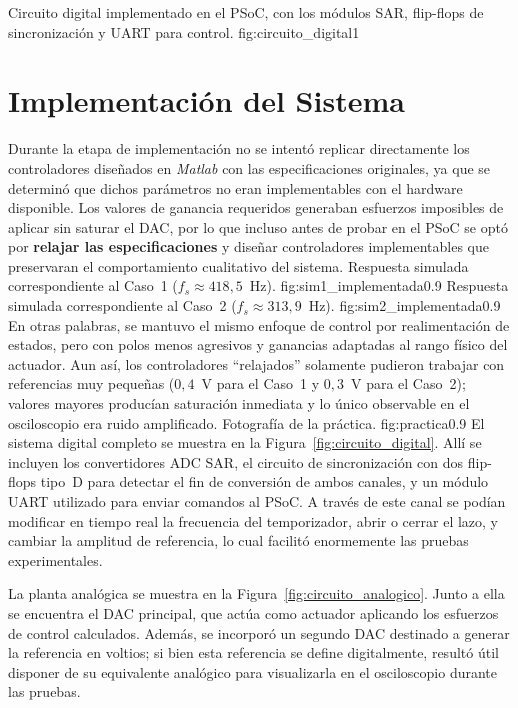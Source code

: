 
{Circuito digital implementado en el PSoC, con los módulos SAR, flip-flops de sincronización y UART para control.}
{fig:circuito_digital}{1}
\section{Implementación del Sistema}

Durante la etapa de implementación no se intentó replicar directamente los controladores diseñados en \textit{Matlab} con las especificaciones originales, 
ya que se determinó que dichos parámetros no eran implementables con el hardware disponible. 
Los valores de ganancia requeridos generaban esfuerzos imposibles de aplicar sin saturar el DAC, 
por lo que incluso antes de probar en el PSoC se optó por \textbf{relajar las especificaciones} 
y diseñar controladores implementables que preservaran el comportamiento cualitativo del sistema.
{Respuesta simulada correspondiente al Caso~1 ($f_s \approx 418{,}5$~Hz).}
{fig:sim1_implementada}{0.9}
{Respuesta simulada correspondiente al Caso~2 ($f_s \approx 313{,}9$~Hz).}
{fig:sim2_implementada}{0.9}
En otras palabras, se mantuvo el mismo enfoque de control por realimentación de estados, 
pero con polos menos agresivos y ganancias adaptadas al rango físico del actuador. 
Aun así, los controladores “relajados” solamente pudieron trabajar con referencias muy pequeñas 
($0{,}4$~V para el Caso~1 y $0{,}3$~V para el Caso~2); 
valores mayores producían saturación inmediata y lo único observable en el osciloscopio era ruido amplificado.
{Fotografía de la práctica.}
{fig:practica}{0.9}
El sistema digital completo se muestra en la Figura~\ref{fig:circuito_digital}. 
Allí se incluyen los convertidores \textsc{ADC SAR}, 
el circuito de sincronización con dos flip-flops tipo~D para detectar el fin de conversión de ambos canales, 
y un módulo \textsc{UART} utilizado para enviar comandos al PSoC. 
A través de este canal se podían modificar en tiempo real la frecuencia del temporizador, 
abrir o cerrar el lazo, y cambiar la amplitud de referencia, 
lo cual facilitó enormemente las pruebas experimentales.




La planta analógica se muestra en la Figura~\ref{fig:circuito_analogico}. 
Junto a ella se encuentra el DAC principal, que actúa como actuador aplicando los esfuerzos de control calculados. 
Además, se incorporó un segundo DAC destinado a generar la referencia en voltios; 
si bien esta referencia se define digitalmente, resultó útil disponer de su equivalente analógico para visualizarla en el osciloscopio durante las pruebas.



